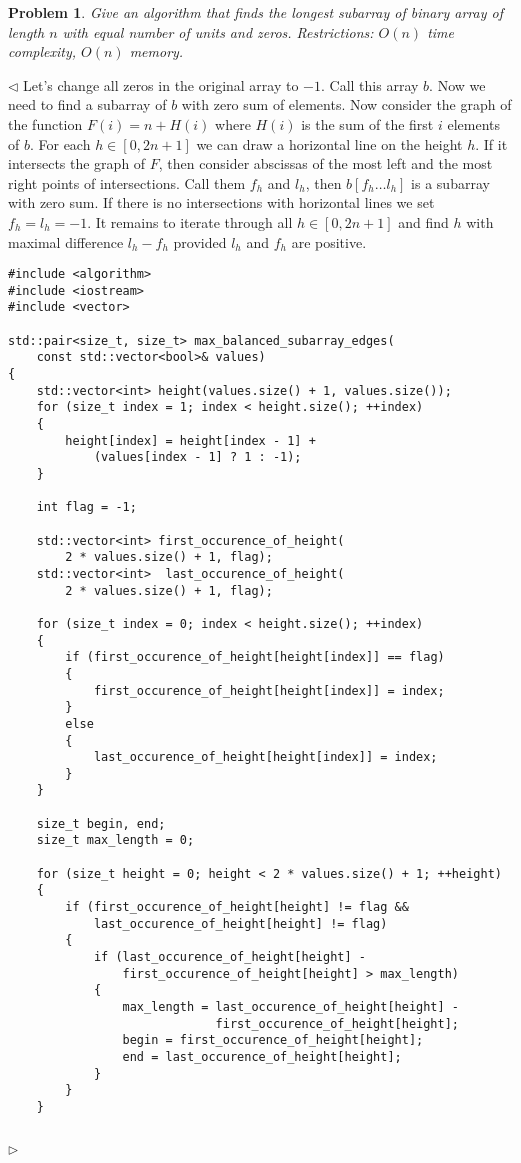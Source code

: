 \documentclass[12pt]{article}
\newtheorem{problem}{Problem}[subsection]
\newenvironment{solution}{\par $\triangleleft$}{$\triangleright$}
\begin{document}
\begin{problem} Give an algorithm that finds the longest subarray of binary
array of length $n$ with equal number of units and zeros. Restrictions: $O(n)$
time complexity, $O(n)$ memory.
\end{problem}
\begin{solution} Let's change all zeros in the original array to $-1$. Call this
    array $b$. Now we need to find a subarray of $b$ with zero sum of elements.
    Now consider the graph of the function $F(i)=n+H(i)$ where $H(i)$ is the sum
    of the first $i$ elements of $b$. For each $h\in[0,2n+1]$ we can draw a
    horizontal line on the height $h$. If it intersects the graph of $F$, then
    consider abscissas of the most left and the most right points of
    intersections. Call them $f_h$ and $l_h$, then $b[f_h\ldots l_h]$ is a
    subarray with zero sum. If there is no intersections with horizontal lines
    we set $f_h=l_h=-1$. It remains to iterate through all $h\in[0,2n+1]$ and
    find $h$ with maximal difference $l_h - f_h$ provided $l_h$ and $f_h$ are
    positive.
    \begin{verbatim}
#include <algorithm>
#include <iostream>
#include <vector>

std::pair<size_t, size_t> max_balanced_subarray_edges(
    const std::vector<bool>& values)
{
    std::vector<int> height(values.size() + 1, values.size());
    for (size_t index = 1; index < height.size(); ++index)
    {
        height[index] = height[index - 1] +
            (values[index - 1] ? 1 : -1);
    }

    int flag = -1;

    std::vector<int> first_occurence_of_height(
        2 * values.size() + 1, flag);
    std::vector<int>  last_occurence_of_height(
        2 * values.size() + 1, flag);

    for (size_t index = 0; index < height.size(); ++index)
    {
        if (first_occurence_of_height[height[index]] == flag)
        {
            first_occurence_of_height[height[index]] = index;
        }
        else
        {
            last_occurence_of_height[height[index]] = index;
        }
    }

    size_t begin, end;
    size_t max_length = 0;

    for (size_t height = 0; height < 2 * values.size() + 1; ++height)
    {
        if (first_occurence_of_height[height] != flag &&
            last_occurence_of_height[height] != flag)
        {
            if (last_occurence_of_height[height] -
                first_occurence_of_height[height] > max_length)
            {
                max_length = last_occurence_of_height[height] -
                             first_occurence_of_height[height];
                begin = first_occurence_of_height[height];
                end = last_occurence_of_height[height];
            }
        }
    }


\end{verbatim}
\end{solution}
\end{document}
